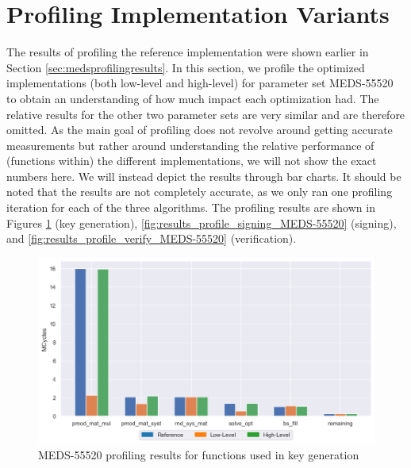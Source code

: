 \documentclass[11pt,a4paper]{report}
\theoremstyle{definition}
\begin{document}
\section{Profiling Implementation Variants}
\label{sec:profilingoptimizations}
The results of profiling the reference implementation were shown earlier in Section \ref{sec:medsprofilingresults}. In this section, we profile the optimized implementations (both low-level and high-level) for parameter set MEDS-55520 to obtain an understanding of how much impact each optimization had. The relative results for the other two parameter sets are very similar and are therefore omitted. As the main goal of profiling does not revolve around getting accurate measurements but rather around understanding the relative performance of (functions within) the different implementations, we will not show the exact numbers here. We will instead depict the results through bar charts. It should be noted that the results are not completely accurate, as we only ran one profiling iteration for each of the three algorithms. The profiling results are shown in Figures \ref{fig:results_profile_keygen_MEDS-55520} (key generation), \ref{fig:results_profile_signing_MEDS-55520} (signing), and \ref{fig:results_profile_verify_MEDS-55520} (verification).

\begin{figure}
  \centering
  \includegraphics[width=\textwidth]{plots/barplot_MEDS-55520_profile_keygen.png}
  \caption{MEDS-55520 profiling results for functions used in key generation}
  \label{fig:results_profile_keygen_MEDS-55520}
\end{figure}
\end{document}
